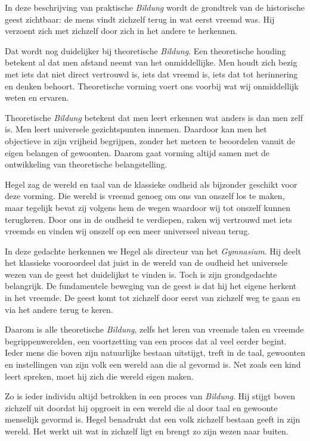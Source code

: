 In deze beschrijving van praktische \textit{Bildung} wordt de grondtrek van de historische geest zichtbaar: de mens vindt zichzelf terug in wat eerst vreemd was. Hij verzoent zich met zichzelf door zich in het andere te herkennen.

Dat wordt nog duidelijker bij theoretische \textit{Bildung}. Een theoretische houding betekent al dat men afstand neemt van het onmiddellijke. Men houdt zich bezig met iets dat niet direct vertrouwd is, iets dat vreemd is, iets dat tot herinnering en denken behoort. Theoretische vorming voert ons voorbij wat wij onmiddellijk weten en ervaren.

Theoretische \textit{Bildung} betekent dat men leert erkennen wat anders is dan men zelf is. Men leert universele gezichtspunten innemen. Daardoor kan men het objectieve in zijn vrijheid begrijpen, zonder het meteen te beoordelen vanuit de eigen belangen of gewoonten. Daarom gaat vorming altijd samen met de ontwikkeling van theoretische belangstelling.

Hegel zag de wereld en taal van de klassieke oudheid als bijzonder geschikt voor deze vorming. Die wereld is vreemd genoeg om ons van onszelf los te maken, maar tegelijk bevat zij volgens hem de wegen waardoor wij tot onszelf kunnen terugkeren. Door ons in de oudheid te verdiepen, raken wij vertrouwd met iets vreemds en vinden wij onszelf op een meer universeel niveau terug.

In deze gedachte herkennen we Hegel als directeur van het \textit{Gymnasium}. Hij deelt het klassieke vooroordeel dat juist in de wereld van de oudheid het universele wezen van de geest het duidelijkst te vinden is. Toch is zijn grondgedachte belangrijk. De fundamentele beweging van de geest is dat hij het eigene herkent in het vreemde. De geest komt tot zichzelf door eerst van zichzelf weg te gaan en via het andere terug te keren.

Daarom is alle theoretische \textit{Bildung}, zelfs het leren van vreemde talen en vreemde begrippenwerelden, een voortzetting van een proces dat al veel eerder begint. Ieder mens die boven zijn natuurlijke bestaan uitstijgt, treft in de taal, gewoonten en instellingen van zijn volk een wereld aan die al gevormd is. Net zoals een kind leert spreken, moet hij zich die wereld eigen maken.

Zo is ieder individu altijd betrokken in een proces van \textit{Bildung}. Hij stijgt boven zichzelf uit doordat hij opgroeit in een wereld die al door taal en gewoonte menselijk gevormd is. Hegel benadrukt dat een volk zichzelf bestaan geeft in zijn wereld. Het werkt uit wat in zichzelf ligt en brengt zo zijn wezen naar buiten.

